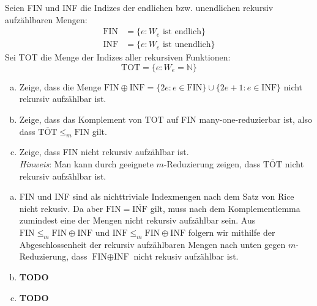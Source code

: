 \documentclass[german,headsepline]{scrartcl}
\theoremstyle{definition}
\begin{document}
	\begin{question}
		Seien FIN und INF die Indizes der endlichen bzw. unendlichen rekursiv aufzählbaren Mengen:
		\begin{align*}
			\text{FIN} &= \{e\colon W_e\text{ ist endlich}\} \\
			\text{INF} &= \{e\colon W_e\text{ ist unendlich}\}
		\end{align*}
		Sei TOT die Menge der Indizes aller rekursiven Funktionen:
			\[\text{TOT}=\{e\colon W_e=\mathbb{N}\}\]
		\begin{enumerate}[(a)]
			\item Zeige, dass die Menge
				$\text{FIN}\oplus\text{INF}=\{2e\colon e\in\text{FIN}\}\cup\{2e+1\colon e\in\text{INF}\}$
				nicht rekursiv aufzählbar ist.
			\item Zeige, dass das Komplement von TOT auf FIN many-one-reduzierbar ist,
				also dass $\overline{\text{TOT}}\leq_m\text{FIN}$ gilt.
			\item Zeige, dass FIN nicht rekursiv aufzählbar ist. \\
				\textit{Hinweis}: Man kann durch geeignete $m$-Reduzierung zeigen,
				dass $\overline{\text{TOT}}$ nicht rekursiv aufzählbar ist.
		\end{enumerate}
	\end{question}
	\begin{solution}
		\begin{enumerate}[(a)]
			\item FIN und INF sind als nichttriviale Indexmengen nach dem Satz von Rice nicht rekusiv.
				Da aber $\text{FIN}=\overline{\text{INF}}$ gilt,
				muss nach dem Komplementlemma zumindest eine der Mengen nicht rekursiv aufzählbar sein.
				Aus $\text{FIN}\leq_m\text{FIN}\oplus\text{INF}$ und $\text{INF}\leq_m\text{FIN}\oplus\text{INF}$
				folgern wir mithilfe der Abgeschlossenheit der rekursiv aufzählbaren Mengen nach unten gegen $m$-Reduzierung,
				dass $\text{FIN}\oplus\text{INF}$ nicht rekusiv aufzählbar ist.
			\item \textbf{TODO}
			\item \textbf{TODO}
		\end{enumerate}
	\end{solution}
	
\end{document}
